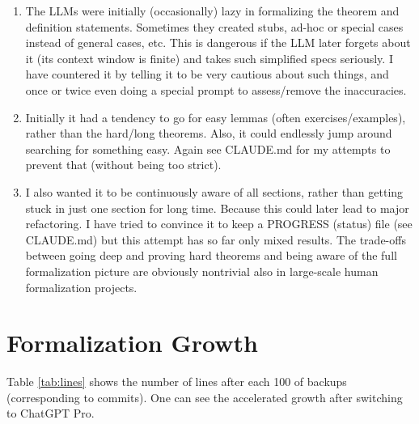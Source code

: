 \documentclass[a4paper,UKenglish,cleveref, autoref, thm-restate]{lipics-v2021}
\begin{document}
\begin{enumerate}
\item The LLMs were initially (occasionally) lazy in formalizing the theorem and definition statements. Sometimes they created stubs, ad-hoc or special cases instead of general cases, etc. This is dangerous if the LLM later forgets about it (its context window is finite) and takes such simplified specs seriously. I have countered it by telling it to be very cautious about such things, and once or twice even doing a special prompt to assess/remove the inaccuracies.
\item Initially it had a tendency to go for easy lemmas (often exercises/examples), rather than the hard/long theorems. Also, it could endlessly jump around searching for something easy. Again see CLAUDE.md for my attempts to prevent that (without being too strict).
\item I also wanted it to be continuously aware of all sections, rather than getting stuck in just one section for long time. Because this could later lead to major refactoring. I have tried to convince it to keep a PROGRESS (status) file (see CLAUDE.md) but this attempt has so far only mixed results. The trade-offs between going deep and proving hard theorems and being aware of the full formalization picture are obviously nontrivial also in large-scale human formalization projects.
\end{enumerate}

\section{Formalization Growth}

%

Table \ref{tab:lines} shows the number of lines after each 100 of backups (corresponding to commits). One can see the accelerated growth after switching to ChatGPT Pro.
\end{document}
